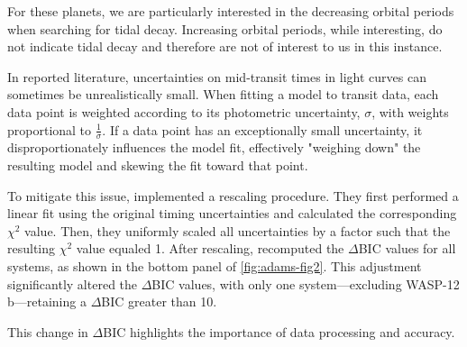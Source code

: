 \documentclass[oneside,12pt]{amsart}
\numberwithin{page}{section}
\begin{document}
For these planets, we are particularly interested in the decreasing orbital periods when searching for tidal decay. Increasing orbital periods, while interesting, do not indicate tidal decay and therefore are not of interest to us in this instance. 

In reported literature, uncertainties on mid-transit times in light curves can sometimes be unrealistically small. When fitting a model to transit data, each data point is weighted according to its photometric uncertainty, $\sigma$, with weights proportional to $\frac{1}{\sigma}$. If a data point has an exceptionally small uncertainty, it disproportionately influences the model fit, effectively "weighing down" the resulting model and skewing the fit toward that point.

To mitigate this issue, \citet{adams2024doomed} implemented a rescaling procedure. They first performed a linear fit using the original timing uncertainties and calculated the corresponding $\chi^2$ value. Then, they uniformly scaled all uncertainties by a factor such that the resulting $\chi^2$ value equaled 1. After rescaling, \citep{adams2024doomed} recomputed the $\Delta$BIC values for all systems, as shown in the bottom panel of \ref{fig:adams-fig2}. This adjustment significantly altered the $\Delta$BIC values, with only one system—excluding WASP-12 b—retaining a $\Delta$BIC greater than 10.

This change in $\Delta$BIC highlights the importance of data processing and accuracy. 

\end{document}
